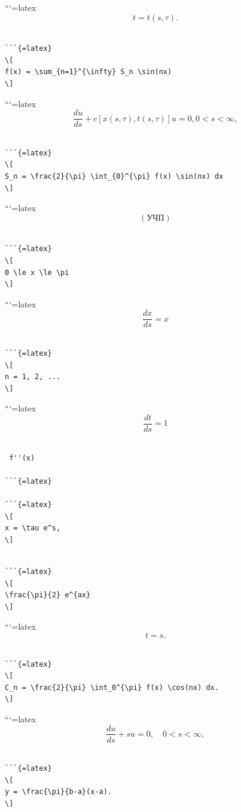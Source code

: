 \documentclass[
]{article}
\begin{document}
```{=latex}
\[
t = t (s, \tau).
\]

\begin{verbatim}

```{=latex}
\[
f(x) = \sum_{n=1}^{\infty} S_n \sin(nx)
\]
\end{verbatim}

```{=latex}
\[
\frac{du}{ds} + c[x(s, \tau), t(s, \tau)]u = 0, 0 < s < \infty,
\]

\begin{verbatim}

```{=latex}
\[
S_n = \frac{2}{\pi} \int_{0}^{\pi} f(x) \sin(nx) dx
\]
\end{verbatim}

```{=latex}
\[
(\text{УЧП})
\]

\begin{verbatim}

```{=latex}
\[
0 \le x \le \pi
\]
\end{verbatim}

```{=latex}
\[
\frac{dx}{ds} = x
\]

\begin{verbatim}

```{=latex}
\[
n = 1, 2, ...
\]
\end{verbatim}

```{=latex}
\[
\frac{dt}{ds} = 1
\]

\begin{verbatim}

 f''(x)

```{=latex}

```{=latex}
\[
x = \tau e^s,
\]
\end{verbatim}

\begin{verbatim}

```{=latex}
\[
\frac{\pi}{2} e^{ax}
\]
\end{verbatim}

```{=latex}
\[
t = s.
\]

\begin{verbatim}

```{=latex}
\[
C_n = \frac{2}{\pi} \int_0^{\pi} f(x) \cos(nx) dx.
\]
\end{verbatim}

```{=latex}
\[
\frac{du}{ds} + su = 0, \quad 0 < s < \infty,
\]

\begin{verbatim}

```{=latex}
\[
y = \frac{\pi}{b-a}(x-a).
\]
\end{verbatim}
\end{document}
